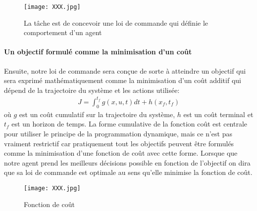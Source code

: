\begin{figure}[H]
	\centering
	\vspace{-10pt}
		\texttt{[image: XXX.jpg]}
		\caption{La tâche est de concevoir une loi de commande qui définie le comportement d'un agent}
		\label{fig:agent}
\end{figure}

\paragraph{Un objectif formulé comme la minimisation d'un coût}
Ensuite, notre loi de commande sera conçue de sorte à atteindre un objectif qui sera exprimé mathématiquement comme la minimisation d'un coût additif qui dépend de la trajectoire du système et les actions utilisée:
\begin{align}
    J=\int_0^{t_f}g(x,u,t) dt + h(x_f,t_f)
\end{align}
où $g$ est un coût cumulatif sur la trajectoire du système, $h$ est un coût terminal et $t_f$ est un horizon de temps. La forme cumulative de la fonction coût est centrale pour utiliser le principe de la programmation dynamique, mais ce n'est pas vraiment restrictif car pratiquement tout les objectifs peuvent être formulés comme la minimisation d'une fonction de coût avec cette forme. Lorsque que notre agent prend les meilleurs décisions possible en fonction de l'objectif on dira que sa loi de commande est optimale au sens qu'elle minimise la fonction de coût. 

\begin{figure}[H]
	\centering
	\vspace{-10pt}
		\texttt{[image: XXX.jpg]}
		\caption{Fonction de coût}
		\label{fig:cost}
\end{figure}




